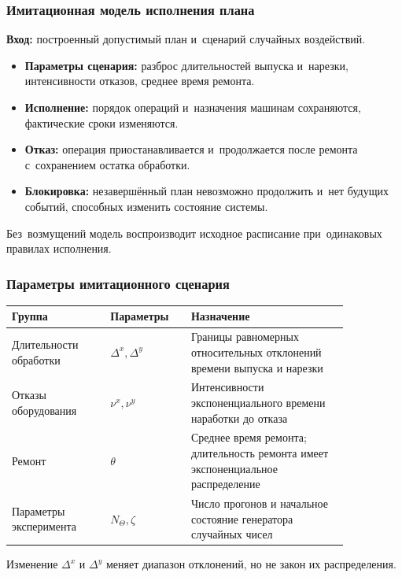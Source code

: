 \begin{frame}
    \frametitle{Имитационная модель исполнения плана}
    \textbf{Вход:} построенный допустимый план и~сценарий случайных воздействий.
    \begin{itemize}
        \item \textbf{Параметры сценария:} разброс длительностей выпуска и~нарезки, интенсивности отказов, среднее время ремонта.
        \item \textbf{Исполнение:} порядок операций и~назначения машинам сохраняются, фактические сроки изменяются.
        \item \textbf{Отказ:} операция приостанавливается и~продолжается после ремонта с~сохранением остатка обработки.
        \item \textbf{Блокировка:} незавершённый план невозможно продолжить и~нет будущих событий, способных изменить состояние системы.
    \end{itemize}
    \vspace{0.2cm}
    Без~возмущений модель воспроизводит исходное расписание при~одинаковых правилах исполнения.
\end{frame}

\begin{frame}
    \frametitle{Параметры имитационного сценария}
    \centering
    \begin{tabular}{|p{0.25\linewidth}|p{0.20\linewidth}|p{0.40\linewidth}|}
        \hline
        \textbf{Группа} & \textbf{Параметры} & \textbf{Назначение} \\
        \hline
        Длительности обработки
        & $\Delta^x,\Delta^y$
        & Границы равномерных относительных отклонений времени выпуска и нарезки \\
        \hline
        Отказы оборудования
        & $\nu^x,\nu^y$
        & Интенсивности экспоненциального времени наработки до отказа \\
        \hline
        Ремонт
        & $\theta$
        & Среднее время ремонта; длительность ремонта имеет экспоненциальное распределение \\
        \hline
        Параметры эксперимента
        & $N_\Theta,\zeta$
        & Число прогонов и начальное состояние генератора случайных чисел \\
        \hline
    \end{tabular}

    \vspace{0.25cm}
    Изменение $\Delta^x$ и $\Delta^y$ меняет диапазон отклонений, но не закон их распределения.
\end{frame}

